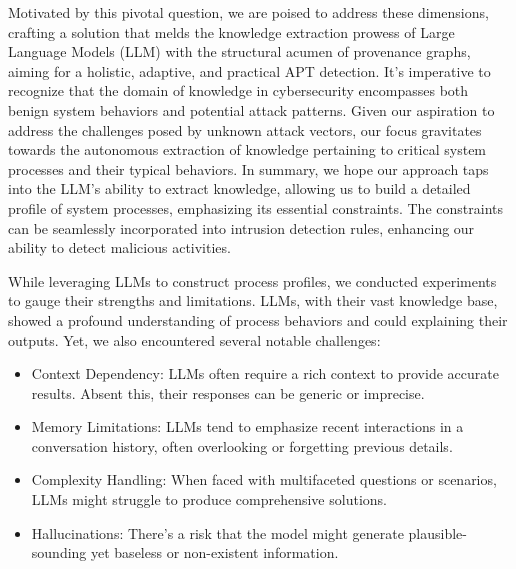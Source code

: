 Motivated by this pivotal question, we are poised to address these dimensions, crafting a solution that melds the knowledge extraction prowess of Large Language Models (LLM) with the structural acumen of provenance graphs, aiming for a holistic, adaptive, and practical APT detection. It's imperative to recognize that the domain of knowledge in cybersecurity encompasses both benign system behaviors and potential attack patterns. Given our aspiration to address the challenges posed by unknown attack vectors, our focus gravitates towards the autonomous extraction of knowledge pertaining to critical system processes and their typical behaviors. In summary, we hope our approach taps into the LLM's ability to extract knowledge, allowing us to build a detailed profile of system processes, emphasizing its essential constraints. The constraints can be seamlessly incorporated into intrusion detection rules, enhancing our ability to detect malicious activities.

While leveraging LLMs to construct process profiles, we conducted experiments to gauge their strengths and limitations. LLMs, with their vast knowledge base, showed a profound understanding of process behaviors and could explaining their outputs. Yet, we also encountered several notable challenges:

\begin{itemize}
    \item Context Dependency: LLMs often require a rich context to provide accurate results. Absent this, their responses can be generic or imprecise.
    \item Memory Limitations: LLMs tend to emphasize recent interactions in a conversation history, often overlooking or forgetting previous details.
    \item Complexity Handling: When faced with multifaceted questions or scenarios, LLMs might struggle to produce comprehensive solutions.
    \item Hallucinations: There's a risk that the model might generate plausible-sounding yet baseless or non-existent information.
\end{itemize}

